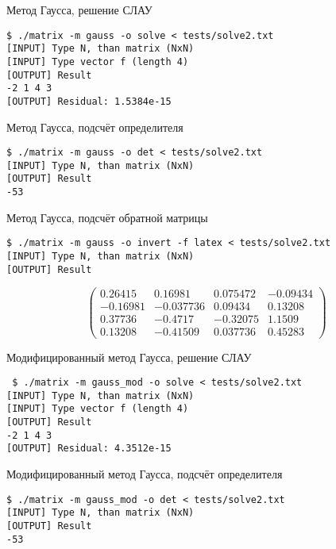 \documentclass[a4paper,11pt]{report}
\begin{document}
\begin{bash}
\caption{Метод Гаусса, решение СЛАУ}
\begin{verbatim}
$ ./matrix -m gauss -o solve < tests/solve2.txt 
[INPUT] Type N, than matrix (NxN)
[INPUT] Type vector f (length 4)
[OUTPUT] Result
-2 1 4 3 
[OUTPUT] Residual: 1.5384e-15
\end{verbatim}
\end{bash}

\begin{bash}
 \caption{Метод Гаусса, подсчёт определителя}
 \begin{verbatim}
$ ./matrix -m gauss -o det < tests/solve2.txt 
[INPUT] Type N, than matrix (NxN)
[OUTPUT] Result
-53
 \end{verbatim}
\end{bash}

\begin{bash}
 \caption{Метод Гаусса, подсчёт обратной матрицы}
 \begin{verbatim}
$ ./matrix -m gauss -o invert -f latex < tests/solve2.txt 
[INPUT] Type N, than matrix (NxN)
[OUTPUT] Result
 \end{verbatim}
$$\begin{pmatrix}
0.26415  & 0.16981  & 0.075472  & -0.09434  \\
-0.16981  & -0.037736  & 0.09434  & 0.13208  \\
0.37736  & -0.4717  & -0.32075  & 1.1509  \\
0.13208  & -0.41509  & 0.037736  & 0.45283 
\end{pmatrix}$$
\end{bash}


\begin{bash}
\caption{Модифицированный метод Гаусса, решение СЛАУ}
\begin{verbatim}
 $ ./matrix -m gauss_mod -o solve < tests/solve2.txt 
[INPUT] Type N, than matrix (NxN)
[INPUT] Type vector f (length 4)
[OUTPUT] Result
-2 1 4 3 
[OUTPUT] Residual: 4.3512e-15
\end{verbatim}
\end{bash}

\begin{bash}
 \caption{Модифицированный метод Гаусса, подсчёт определителя}
 \begin{verbatim}
$ ./matrix -m gauss_mod -o det < tests/solve2.txt 
[INPUT] Type N, than matrix (NxN)
[OUTPUT] Result
-53
 \end{verbatim}
\end{bash}
\end{document}
